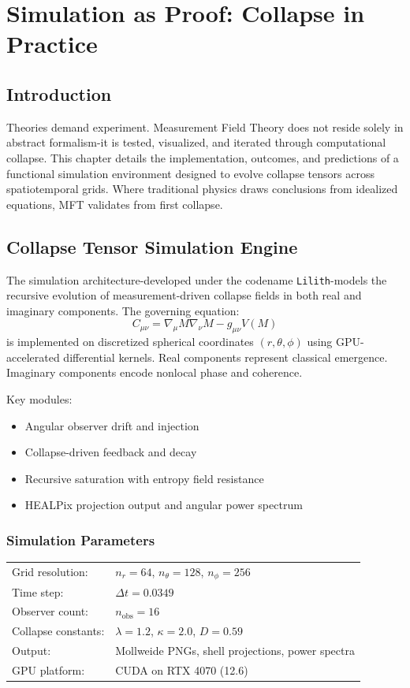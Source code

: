 \chapter{Simulation as Proof: Collapse in Practice}

\section{Introduction}
Theories demand experiment. Measurement Field Theory does not reside solely in abstract formalism-it is tested, visualized, and iterated through computational collapse. This chapter details the implementation, outcomes, and predictions of a functional simulation environment designed to evolve collapse tensors across spatiotemporal grids. Where traditional physics draws conclusions from idealized equations, MFT validates from first collapse.

\section{Collapse Tensor Simulation Engine}
The simulation architecture-developed under the codename \texttt{Lilith}-models the recursive evolution of measurement-driven collapse fields in both real and imaginary components. The governing equation:
\[
C_{\mu\nu} = \nabla_\mu M \nabla_\nu M - g_{\mu\nu} V(M)
\]
is implemented on discretized spherical coordinates $(r, \theta, \phi)$ using GPU-accelerated differential kernels. Real components represent classical emergence. Imaginary components encode nonlocal phase and coherence.

Key modules:
\begin{itemize}
  \item Angular observer drift and injection
  \item Collapse-driven feedback and decay
  \item Recursive saturation with entropy field resistance
  \item HEALPix projection output and angular power spectrum
\end{itemize}

\subsection*{Simulation Parameters}
\begin{tabular}{ll}
Grid resolution: & $n_r = 64$, $n_\theta = 128$, $n_\phi = 256$ \\
Time step: & $\Delta t = 0.0349$ \\
Observer count: & $n_{\text{obs}} = 16$ \\
Collapse constants: & $\lambda = 1.2$, $\kappa = 2.0$, $D = 0.59$ \\
Output: & Mollweide PNGs, shell projections, power spectra \\
GPU platform: & CUDA on RTX 4070 (12.6)
\end{tabular}

